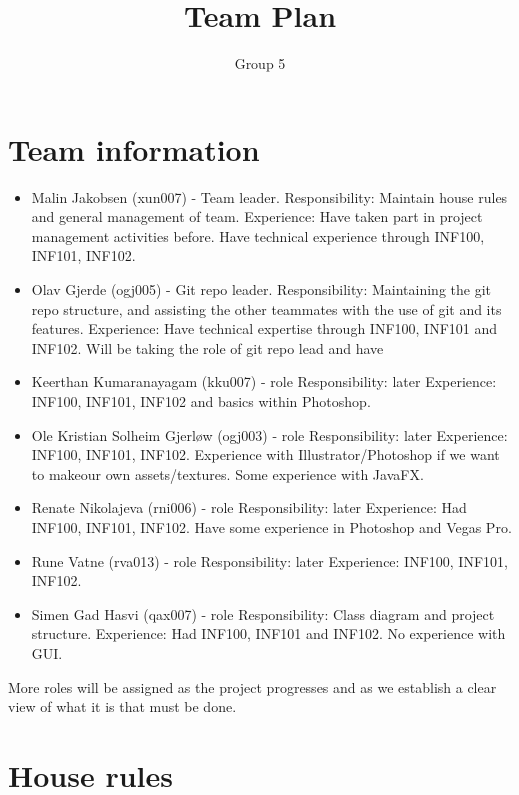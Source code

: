 \documentclass[12pt]{article}%
\title{Team Plan}
\author{Group 5}
\date{}
\begin{document}
\maketitle

\section{Team information}
\begin{itemize}
\item Malin Jakobsen (xun007) - Team leader. 
Responsibility: Maintain house rules and general management of team.
	Experience: Have taken part in project management activities before. Have technical
experience through INF100, INF101, INF102. 

\item Olav Gjerde (ogj005) - Git repo leader. 
Responsibility: Maintaining the git repo structure, and assisting the other teammates 
with the use of git and its features.
Experience: Have technical expertise through INF100, INF101 and INF102. Will be
taking the role of git repo lead and have 
\item Keerthan Kumaranayagam (kku007) -  {role}
Responsibility: {later}
Experience: INF100, INF101, INF102 and basics within Photoshop. 
\item Ole Kristian Solheim Gjerløw (ogj003) - {role}
Responsibility: {later}
Experience: INF100, INF101, INF102. Experience with Illustrator/Photoshop if we want to makeour own assets/textures. Some experience with JavaFX.
\item Renate Nikolajeva (rni006) - {role}
Responsibility: {later}
	Experience: Had INF100, INF101, INF102. Have some experience in Photoshop and
Vegas Pro. 

\item Rune Vatne  (rva013) - {role}
Responsibility: {later}
	Experience: INF100, INF101, INF102. 
\item Simen Gad Hasvi  (qax007) - {role}
Responsibility: Class diagram and project structure.
	Experience: Had INF100, INF101 and INF102. No experience with GUI.
\end{itemize}
        
More roles will be assigned as the project progresses and as we establish a clear view of what it is that must be done.

\section{House rules}
\end{document}
